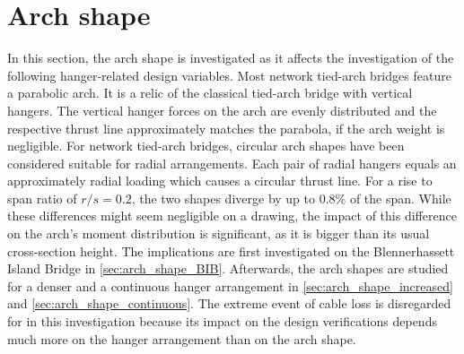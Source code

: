 \newpage
\section{Arch shape} \label{sec:arch_shape}
In this section, the arch shape is investigated as it affects the investigation of the following hanger-related design variables. Most network tied-arch bridges feature a parabolic arch. It is a relic of the classical tied-arch bridge with vertical hangers. 
The vertical hanger forces on the arch are evenly distributed and the respective thrust line approximately matches the parabola, if the arch weight is negligible.
For network tied-arch bridges, circular arch shapes have been considered suitable for radial arrangements. Each pair of radial hangers equals an approximately radial loading which causes a circular thrust line.
For a rise to span ratio of $r/s=0.2$, the two shapes diverge by up to 0.8\% of the span. While these differences might seem negligible on a drawing, the impact of this difference on the arch's moment distribution is significant, as it is bigger than its usual cross-section height. 
The implications are first investigated on the Blennerhassett Island Bridge in \cref{sec:arch_shape_BIB}. Afterwards, the arch shapes are studied for a denser and a continuous hanger arrangement in \cref{sec:arch_shape_increased} and \cref{sec:arch_shape_continuous}. The extreme event of cable loss is disregarded for in this investigation because its impact on the design verifications depends much more on the hanger arrangement than on the arch shape.

